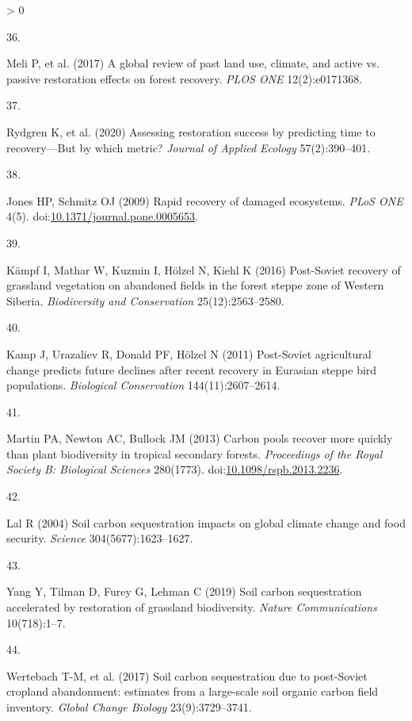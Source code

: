 \documentclass[9pt,twocolumn,twoside,lineno]{pnas-new}
\newlength{\csllabelwidth}
\newlength{\cslhangindent}
\newenvironment{CSLReferences}[2] %
 {%
  \setlength{\parindent}{0pt}
  \ifodd #1 \everypar{\setlength{\hangindent}{\cslhangindent}}\ignorespaces\fi
  \ifnum #2 > 0
  \setlength{\parskip}{#2\baselineskip}
  \fi
 }%
 {}
\newcommand{\CSLLeftMargin}[1]{\parbox[t]{\csllabelwidth}{#1}}
\newcommand{\CSLRightInline}[1]{\parbox[t]{\linewidth - \csllabelwidth}{#1}\break}
\begin{document}
\begin{CSLReferences}{0}{0}
\leavevmode\hypertarget{ref-Meli2017}{}%
\CSLLeftMargin{36. }
\CSLRightInline{Meli P, et al. (2017) {A global review of past land use, climate, and active vs. passive restoration effects on forest recovery}. \emph{PLOS ONE} 12(2):e0171368.}

\leavevmode\hypertarget{ref-Rydgren2020}{}%
\CSLLeftMargin{37. }
\CSLRightInline{Rydgren K, et al. (2020) {Assessing restoration success by predicting time to recovery---But by which metric?} \emph{Journal of Applied Ecology} 57(2):390--401.}

\leavevmode\hypertarget{ref-Jones2009}{}%
\CSLLeftMargin{38. }
\CSLRightInline{Jones HP, Schmitz OJ (2009) {Rapid recovery of damaged ecosystems}. \emph{PLoS ONE} 4(5). doi:\href{https://doi.org/10.1371/journal.pone.0005653}{10.1371/journal.pone.0005653}.}

\leavevmode\hypertarget{ref-Kampf2016}{}%
\CSLLeftMargin{39. }
\CSLRightInline{Kämpf I, Mathar W, Kuzmin I, Hölzel N, Kiehl K (2016) {Post-Soviet recovery of grassland vegetation on abandoned fields in the forest steppe zone of Western Siberia}. \emph{Biodiversity and Conservation} 25(12):2563--2580.}

\leavevmode\hypertarget{ref-Kamp2011}{}%
\CSLLeftMargin{40. }
\CSLRightInline{Kamp J, Urazaliev R, Donald PF, Hölzel N (2011) {Post-Soviet agricultural change predicts future declines after recent recovery in Eurasian steppe bird populations}. \emph{Biological Conservation} 144(11):2607--2614.}

\leavevmode\hypertarget{ref-Martin2013}{}%
\CSLLeftMargin{41. }
\CSLRightInline{Martin PA, Newton AC, Bullock JM (2013) {Carbon pools recover more quickly than plant biodiversity in tropical secondary forests}. \emph{Proceedings of the Royal Society B: Biological Sciences} 280(1773). doi:\href{https://doi.org/10.1098/rspb.2013.2236}{10.1098/rspb.2013.2236}.}

\leavevmode\hypertarget{ref-Lal2004}{}%
\CSLLeftMargin{42. }
\CSLRightInline{Lal R (2004) {Soil carbon sequestration impacts on global climate change and food security}. \emph{Science} 304(5677):1623--1627.}

\leavevmode\hypertarget{ref-Yang2019}{}%
\CSLLeftMargin{43. }
\CSLRightInline{Yang Y, Tilman D, Furey G, Lehman C (2019) {Soil carbon sequestration accelerated by restoration of grassland biodiversity}. \emph{Nature Communications} 10(718):1--7.}

\leavevmode\hypertarget{ref-Wertebach2017}{}%
\CSLLeftMargin{44. }
\CSLRightInline{Wertebach T-M, et al. (2017) {Soil carbon sequestration due to post-Soviet cropland abandonment: estimates from a large-scale soil organic carbon field inventory}. \emph{Global Change Biology} 23(9):3729--3741.}


\end{CSLReferences}
\end{document}
